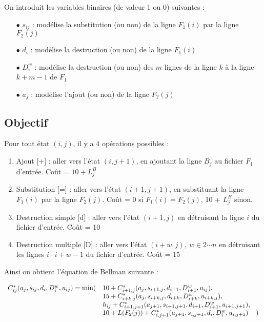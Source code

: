\documentclass[a4paper, 10pt, french]{article}
\begin{document}
On introduit les variables binaires (de valeur 1 ou 0) suivantes :
\\

\begin{itemize}
\item[$\bullet$]
$s_{ij}$ : modélise la substitution (ou non) de la ligne $F_1(i)$ par la ligne $F_2(j)$
\\
\item[$\bullet$]
$d_i$ : modélise la destruction (ou non) de la ligne $F_1(i)$
\\
\item[$\bullet$]
$D_i^w$ : modélise la destruction (ou non) des $m$ lignes de la ligne $k$ à la ligne $k+m-1$ de $F_1$
\\
\item[$\bullet$]
$a_j$ : modélise l'ajout (ou non) de la ligne $F_2(j)$
\end{itemize}
\vspace{3mm}


\subsection*{Objectif}

Pour tout état $(i,j)$, il y a 4 opérations possibles :
\begin{enumerate}
\item Ajout [+] : aller vers l'état $(i,j+1)$, en ajoutant la ligne $B_j$ au fichier $F_1$ d'entrée. Coût = $10 + L_j^B$

\item Substitution [=] : aller vers l'état $(i+1,j+1)$, en substituant la ligne $F_1(i)$ par la ligne $F_2(j)$. Coût = 0 si $F_1(i) = F_2(j)$, 10 + $L_j^B$ sinon.

\item Destruction simple [d] : aller vers l'état $(i+1,j)$ en détruisant la ligne $i$ du fichier d'entrée. Coût = 10

\item Destruction multiple [D] : aller vers l'état $(i+w,j),\ w \in 2 \cdots n$ en détruisant les lignes $i \cdots i + w-1$ du fichier d'entrée. Coût = 15
\end{enumerate}
\vspace{3mm}

Ainsi on obtient l'équation de Bellman suivante :

$$\begin{array}{rll}
C^*_{ij}(a_{j},s_{ij},d_{i},D_{i}^w, u_{ij}) = \min ( & 10 + C^*_{i+1,j}(a_{j},s_{i+1,j},d_{i+1},D_{i+1}^w, u_{ij}),\\
& 15 + C^*_{i+k,j}(a_{j},s_{i+k,j},d_{i+k},D_{i+k}^w, u_{i+k,j}),\\
& h_{ij} + C^*_{i+1,j+1}(a_{j+1},s_{i+1,j+1},d_{i+1},D_{i+1}^w, u_{i+1,j+1}),\\
& 10 + L(F_2(j)) + C^*_{i,j+1}(a_{j+1},s_{i,j+1},d_{i},D_{i}^w, u_{i,j+1}) \hspace{4mm} )
\end{array}$$

\end{document}
